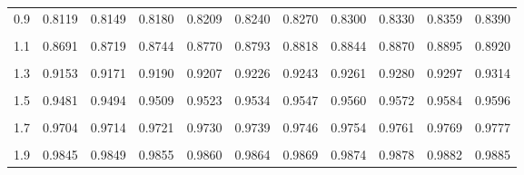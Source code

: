 \documentclass[
]{article}
\begin{document}
\begin{longtable}[l]{lcccccccccc}
0.9 & 0.8119 & 0.8149 & 0.8180 & 0.8209 & 0.8240 & 0.8270 & 0.8300 & 0.8330 & 0.8359 & 0.8390\\
\cellcolor{gray!15}{1} & \cellcolor{gray!15}{0.8418} & \cellcolor{gray!15}{0.8448} & \cellcolor{gray!15}{0.8478} & \cellcolor{gray!15}{0.8506} & \cellcolor{gray!15}{0.8532} & \cellcolor{gray!15}{0.8560} & \cellcolor{gray!15}{0.8587} & \cellcolor{gray!15}{0.8613} & \cellcolor{gray!15}{0.8639} & \cellcolor{gray!15}{0.8665}\\
1.1 & 0.8691 & 0.8719 & 0.8744 & 0.8770 & 0.8793 & 0.8818 & 0.8844 & 0.8870 & 0.8895 & 0.8920\\
\cellcolor{gray!15}{1.2} & \cellcolor{gray!15}{0.8944} & \cellcolor{gray!15}{0.8966} & \cellcolor{gray!15}{0.8989} & \cellcolor{gray!15}{0.9010} & \cellcolor{gray!15}{0.9031} & \cellcolor{gray!15}{0.9052} & \cellcolor{gray!15}{0.9073} & \cellcolor{gray!15}{0.9092} & \cellcolor{gray!15}{0.9114} & \cellcolor{gray!15}{0.9133}\\
1.3 & 0.9153 & 0.9171 & 0.9190 & 0.9207 & 0.9226 & 0.9243 & 0.9261 & 0.9280 & 0.9297 & 0.9314\\
\cellcolor{gray!15}{1.4} & \cellcolor{gray!15}{0.9330} & \cellcolor{gray!15}{0.9345} & \cellcolor{gray!15}{0.9362} & \cellcolor{gray!15}{0.9378} & \cellcolor{gray!15}{0.9395} & \cellcolor{gray!15}{0.9409} & \cellcolor{gray!15}{0.9424} & \cellcolor{gray!15}{0.9437} & \cellcolor{gray!15}{0.9452} & \cellcolor{gray!15}{0.9466}\\
1.5 & 0.9481 & 0.9494 & 0.9509 & 0.9523 & 0.9534 & 0.9547 & 0.9560 & 0.9572 & 0.9584 & 0.9596\\
\cellcolor{gray!15}{1.6} & \cellcolor{gray!15}{0.9607} & \cellcolor{gray!15}{0.9617} & \cellcolor{gray!15}{0.9628} & \cellcolor{gray!15}{0.9639} & \cellcolor{gray!15}{0.9649} & \cellcolor{gray!15}{0.9658} & \cellcolor{gray!15}{0.9667} & \cellcolor{gray!15}{0.9676} & \cellcolor{gray!15}{0.9686} & \cellcolor{gray!15}{0.9695}\\
1.7 & 0.9704 & 0.9714 & 0.9721 & 0.9730 & 0.9739 & 0.9746 & 0.9754 & 0.9761 & 0.9769 & 0.9777\\
\cellcolor{gray!15}{1.8} & \cellcolor{gray!15}{0.9785} & \cellcolor{gray!15}{0.9791} & \cellcolor{gray!15}{0.9798} & \cellcolor{gray!15}{0.9804} & \cellcolor{gray!15}{0.9811} & \cellcolor{gray!15}{0.9816} & \cellcolor{gray!15}{0.9822} & \cellcolor{gray!15}{0.9828} & \cellcolor{gray!15}{0.9834} & \cellcolor{gray!15}{0.9840}\\
1.9 & 0.9845 & 0.9849 & 0.9855 & 0.9860 & 0.9864 & 0.9869 & 0.9874 & 0.9878 & 0.9882 & 0.9885\\

\end{longtable}
\end{document}
